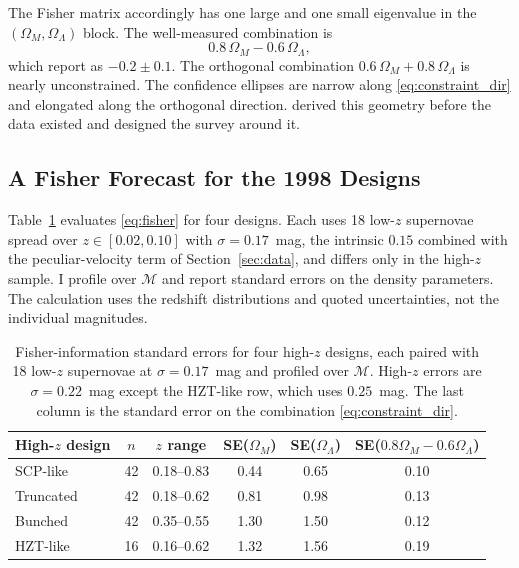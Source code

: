\documentclass[12pt]{article}
\begin{document}
The Fisher matrix accordingly has one large and one small eigenvalue in the
$(\Omega_M,\Omega_\Lambda)$ block.  The well-measured combination is
\begin{equation}\label{eq:constraint_dir}
  0.8\,\Omega_M - 0.6\,\Omega_\Lambda,
\end{equation}
which \citet{Perlmutter1999} report as $-0.2 \pm 0.1$.  The orthogonal
combination $0.6\,\Omega_M + 0.8\,\Omega_\Lambda$ is nearly unconstrained.
The confidence ellipses are narrow along \eqref{eq:constraint_dir} and
elongated along the orthogonal direction.  \citet{GoobarPerlmutter1995}
derived this geometry before the data existed and designed the survey around
it.

\subsection{A Fisher Forecast for the 1998 Designs}
\label{sec:forecast}

Table~\ref{tab:forecast} evaluates \eqref{eq:fisher} for four designs.  Each
uses 18 low-$z$ supernovae spread over $z\in[0.02,0.10]$ with
$\sigma = 0.17$~mag, the intrinsic $0.15$ combined with the peculiar-velocity
term of Section~\ref{sec:data}, and differs only in the high-$z$ sample.  I
profile over
$\mathcal{M}$ and report standard errors on the density parameters.  The
calculation uses the redshift distributions and quoted uncertainties, not the
individual magnitudes.

\begin{table}[ht]
\centering
\caption{Fisher-information standard errors for four high-$z$ designs, each
paired with 18 low-$z$ supernovae at $\sigma = 0.17$~mag and profiled over
$\mathcal{M}$.  High-$z$ errors are $\sigma = 0.22$~mag except the HZT-like
row, which uses $0.25$~mag.  The last column is the standard error on the
combination \eqref{eq:constraint_dir}.}
\label{tab:forecast}
\medskip
\begin{tabular}{lccccc}
\toprule
High-$z$ design & $n$ & $z$ range & SE($\Omega_M$) & SE($\Omega_\Lambda$)
  & SE($0.8\Omega_M-0.6\Omega_\Lambda$) \\
\midrule
SCP-like            & 42 & 0.18--0.83 & 0.44 & 0.65 & 0.10 \\
Truncated           & 42 & 0.18--0.62 & 0.81 & 0.98 & 0.13 \\
Bunched             & 42 & 0.35--0.55 & 1.30 & 1.50 & 0.12 \\
HZT-like            & 16 & 0.16--0.62 & 1.32 & 1.56 & 0.19 \\
\bottomrule
\end{tabular}
\end{table}
\end{document}
